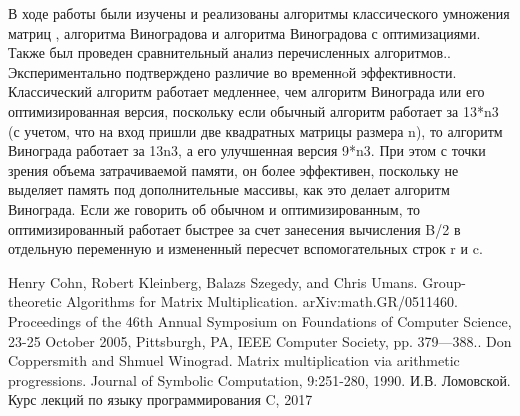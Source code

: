 \documentclass[a4paper, 14pt]{article}
\begin{document}
	\hspace{1cm}В ходе работы были изучены и реализованы алгоритмы классического умножения матриц , алгоритма Виноградова и алгоритма Виноградова с оптимизациями. Также был проведен сравнительный анализ перечисленных алгоритмов.. Экспериментально подтверждено различие во временнoй эффективности. Классический алгоритм работает медленнее, чем алгоритм Винограда или его оптимизированная версия, поскольку если обычный алгоритм работает за 13*n3 (с учетом, что на вход пришли две квадратных матрицы размера n), то алгоритм Винограда работает за 13n3, а его улучшенная версия 9*n3. При этом с точки зрения объема затрачиваемой памяти, он более эффективен, поскольку не выделяет память под дополнительные массивы, как это делает алгоритм Винограда. Если же говорить об обычном и оптимизированным, то оптимизированный работает быстрее за счет занесения вычисления B/2 в отдельную переменную и измененный пересчет вспомогательных строк r и c.
    

    \newpage

    \begin{thebibliography}{9} 
     Henry Cohn, Robert Kleinberg, Balazs Szegedy, and Chris Umans. Group-theoretic Algorithms for Matrix Multiplication. arXiv:math.GR/0511460. Proceedings of the 46th Annual Symposium on Foundations of Computer Science, 23-25 October 2005, Pittsburgh, PA, IEEE Computer Society, pp. 379—388.. 
     Don Coppersmith and Shmuel Winograd. Matrix multiplication via arithmetic progressions. Journal of Symbolic Computation, 9:251-280, 1990.
    И.В. Ломовской. Курс лекций по языку программирования C, 2017
    
    \end{thebibliography}

		
		
		
\end{document}
